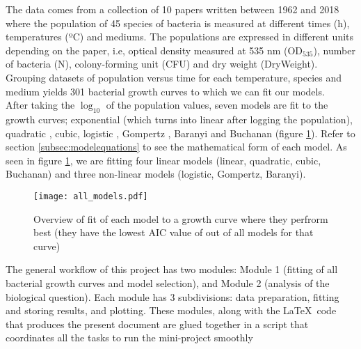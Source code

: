 \documentclass[titlepage,11pt]{article}
\begin{document}
\begin{linenumbers}
			The data comes from a collection of 10 papers written between 1962 and 2018 \cite{Bae2014, Bernhardt2018, Galarz2016, Gill1991, Phillips1987, ROTH1962, DaSilva2018, Sivonen1990, Stannard1985, Zwietering1994} where the population of 45 species of bacteria is measured at different times (h), temperatures (ºC) and mediums.  The populations are expressed in different units depending on the paper, i.e,  optical density measured at 535 nm (OD$_{535} $), number of bacteria (N), colony-forming unit (CFU) and dry weight (DryWeight). Grouping datasets of population versus time for each temperature, species and medium yields 301 bacterial growth curves to which we can fit our models.\\
			After taking the $ \log_{10} $ of the population values, seven models are fit to the growth curves; exponential (which turns into linear after logging the population), quadratic , cubic, logistic \cite{Pearl1920, Verhulst1838}, Gompertz \cite{Zwietering1990}, Baranyi \cite{Baranyi1994} and Buchanan \cite{Buchanan1997} (figure \ref{all_models}). Refer to section \ref{subsec:modelequations} to see the mathematical form of each model. As seen in figure \ref{all_models}, we are fitting four linear models (linear, quadratic, cubic, Buchanan) and three non-linear models (logistic, Gompertz, Baranyi). \\
			\begin{figure}[h]
				\texttt{[image: all\_models.pdf]}
				\centering
				\caption{Overview of fit of each model to a growth curve where they perfrorm best (they have the lowest AIC value of out of all models for that curve)}
				\label{all_models}
			\end{figure}
			
			The general workflow of this project has two modules: Module 1 (fitting of all bacterial growth curves and model selection), and Module 2 (analysis of the biological question).  Each module has 3 subdivisions: data preparation, fitting and storing results, and plotting. These modules, along with the \LaTeX \ code that produces the present document are glued together in a script that coordinates all the tasks to run the mini-project smoothly

\end{linenumbers}
\end{document}

